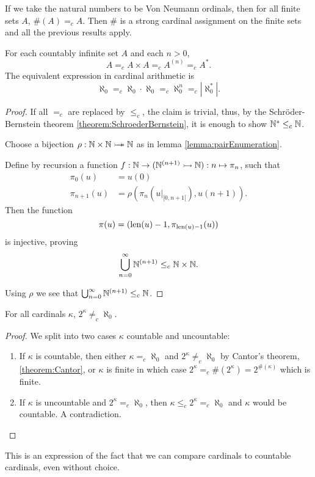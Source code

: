 If we take the natural numbers to be Von Neumann ordinals, then for all finite sets $A$, $\#(A) =_c A$. Then $\#$ is a strong cardinal assignment on the finite sets and all the previous results apply.


\begin{proposition}
For each countably infinite set $A$ and each $n>0$,
\[A =_c A\times A =_c A^{(n)} =_c A^*. \]
The equivalent expression in cardinal arithmetic is
\[ \aleph_0 =_c \aleph_0\cdot\aleph_0 =_c \aleph_0^n =_c |\aleph_0^*|. \]
\end{proposition}
\begin{proof}
If all $=_c$ are replaced by $\leq_c$, the claim is trivial, thus, by the Schröder-Bernstein theorem \ref{theorem:SchroederBernstein}, it is enough to show $\mathbb{N}^*\leq_c \mathbb{N}$.

Choose a bijection $\rho: \mathbb{N}\times\mathbb{N}\mathrel{\rightarrowtail\kern-1.9ex\twoheadrightarrow} \mathbb{N}$ as in lemma \ref{lemma:pairEnumeration}.

Define by recursion a function $f:\mathbb{N}\to (\mathbb{N}^{(n+1)}\rightarrowtail \mathbb{N}): n\mapsto \pi_n$, such that
\begin{align*}
\pi_0(u) &= u(0) \\
\pi_{n+1}(u) &= \rho(\pi_n(u|_{[0,n+1[}), u(n+1)).
\end{align*}
Then the function
\[ \pi(u) = (\operatorname{len}(u)-1, \pi_{\operatorname{len}(u)-1}(u)) \]
is injective, proving
\[ \bigcup_{n=0}^\infty \mathbb{N}^{(n+1)}\leq_c \mathbb{N}\times \mathbb{N}. \]

Using $\rho$ we see that $\bigcup_{n=0}^\infty \mathbb{N}^{(n+1)}\leq_c \mathbb{N}$.
\end{proof}

\begin{lemma}
For all cardinals $\kappa$, $2^\kappa \neq_c \aleph_0$.
\end{lemma}
\begin{proof}
We split into two cases $\kappa$ countable and uncountable:
\begin{enumerate}
\item If $\kappa$ is countable, then either $\kappa =_c \aleph_0$ and $2^\kappa \neq_c \aleph_0$ by Cantor's theorem, \ref{theorem:Cantor}, or $\kappa$ is finite in which case $2^\kappa =_c \#(2^{\kappa}) = 2^{\#(\kappa)}$ which is finite.
\item If $\kappa$ is uncountable and $2^\kappa =_c \aleph_0$, then $\kappa \leq_c 2^\kappa =_c \aleph_0$ and $\kappa$ would be countable. A contradiction.
\end{enumerate}
\end{proof}
This is an expression of the fact that we can compare cardinals to countable cardinals, even without choice.

